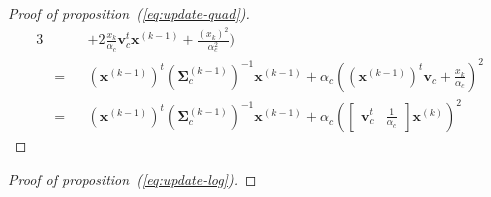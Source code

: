 \documentclass[journal]{IEEEtran}
\begin{document}
\begin{proof}[Proof of proposition~(\ref{eq:update-quad})]
\begin{alignat*}{3}
     & &&+ 2 \frac{x_k}{\alpha_c} \mathbf{v}_c^t \mathbf{x}^{(k-1)} + \frac{(x_k)^2}{\alpha_c^2}) \\
     &= &&(\mathbf{x}^{(k-1)})^t (\boldsymbol{\Sigma}_c^{(k-1)})^{-1} \mathbf{x}^{(k-1)} + \alpha_c ( (\mathbf{x}^{(k-1)})^t \mathbf{v}_c + \frac{x_k}{\alpha_c} )^2 \\
     &= &&(\mathbf{x}^{(k-1)})^t (\boldsymbol{\Sigma}_c^{(k-1)})^{-1} \mathbf{x}^{(k-1)} + \alpha_c ( \left[\begin{array}{cc} \mathbf{v}_c^t & \frac{1}{\alpha_c} \end{array}\right] \mathbf{x}^{(k)} )^2
    \end{alignat*}
\end{proof}

\begin{proof}[Proof of proposition~(\ref{eq:update-log})]


\end{proof}
\end{document}
